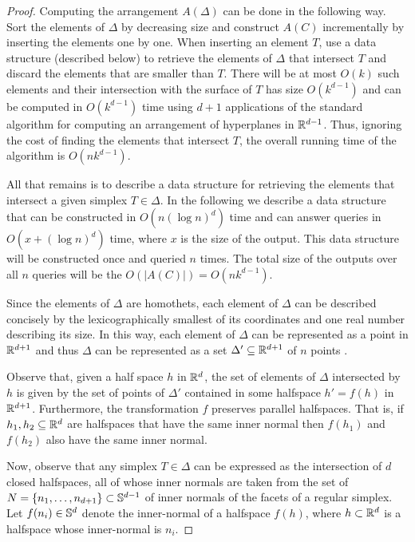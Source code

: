 \documentclass[lotsofwhite]{patmorin}
\begin{document}
\begin{proof}
  Computing the arrangement $A(\Delta)$ can be done in the following way.
  Sort the elements of $\Delta$ by decreasing size and construct $A(C)$
  incrementally by inserting the elements one by one.  When inserting
  an element $T$, use a data structure (described below) to retrieve
  the elements of $\Delta$ that intersect $T$ and discard the elements
  that are smaller than $T$.  There will be at most $O(k)$ such elements
  and their intersection with the surface of $T$ has size $O(k^{d-1})$
  and can be computed in $O(k^{d-1})$ time using $d+1$ applications of
  the standard algorithm for computing an arrangement of hyperplanes
  in $\mathbb{R}^{d-1}$.  Thus, ignoring the cost of finding the elements
  that intersect $T$, the overall running time of the algorithm is
  $O(nk^{d-1})$.

  All that remains is to describe a data structure for retrieving the
  elements that intersect a given simplex $T\in\Delta$.  In the following
  we describe a data structure that can be constructed in $O(n(\log
  n)^{d})$ time and can answer queries in $O(x + (\log n)^{d})$ time,
  where $x$ is the size of the output.  This data structure will be
  constructed once and queried $n$ times.  The total size of the outputs
  over all $n$ queries will be the $O(|A(C)|)=O(nk^{d-1})$.

  Since the elements of $\Delta$ are homothets, each element of $\Delta$
  can be described concisely by the lexicographically smallest of its
  coordinates and one real number describing its size. In this way,
  each element of $\Delta$ can be represented as a point in $\mathbb{R}^{d+1}$
  and thus $\Delta$ can be represented as a set $\Delta'\subseteq\mathbb{R}^{d+1}$
  of $n$ points .

  Observe that, given a half space $h$ in $\mathbb{R}^d$, the set of elements of
  $\Delta$ intersected by $h$ is given by the set of points of $\Delta'$
  contained in some halfspace $h'=f(h)$ in $\mathbb{R}^{d+1}$.  Furthermore,
  the transformation $f$ preserves parallel halfspaces.  That is,
  if $h_1,h_2\subseteq{\mathbb{R}^d}$ are halfspaces that have the same inner
  normal then $f(h_1)$ and $f(h_2)$ also have the same inner normal.

  Now, observe that any simplex $T\in\Delta$ can be expressed as the
  intersection of $d$ closed halfspaces, all of whose inner normals are
  taken from the set of $N=\{n_1,\ldots,n_{d+1}\}\subset \mathbb{S}^{d-1}$ of
  inner normals of the facets of a regular simplex.  Let $f(n_i)\in\mathbb{S}^d$
  denote the inner-normal of a halfspace $f(h)$, where $h\subset\mathbb{R}^d$
  is a halfspace whose inner-normal is $n_i$.


\end{proof}
\end{document}
